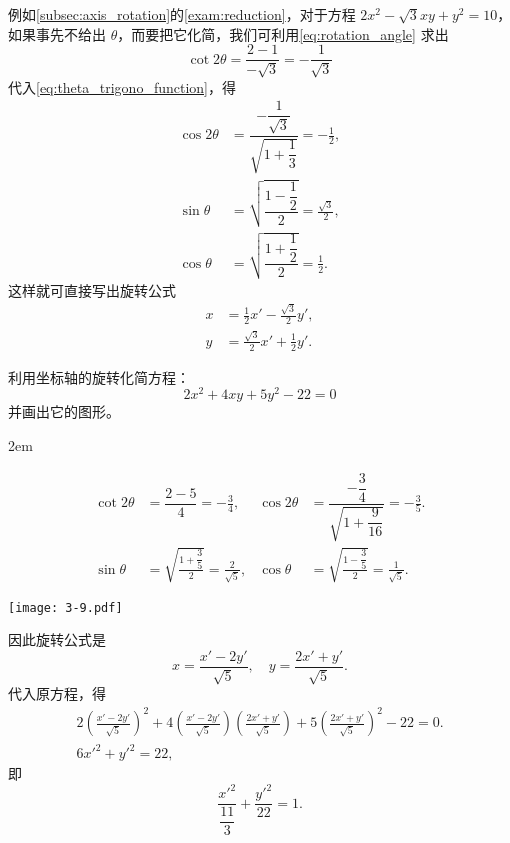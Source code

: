 例如\cref{subsec:axis_rotation}的\cref{exam:reduction}，对于方程 $2x^2-\sqrt{3}xy+y^2=10$，如果事先不给出 $\theta$，而要把它化简，我们可利用\cref{eq:rotation_angle} 求出
\[\cot2\theta=\frac{2-1}{-\sqrt{3}}=-\frac{1}{\sqrt{3}}\]
代入\cref{eq:theta_trigono_function}，得
\begin{align*}
  \cos2\theta&=\dfrac{-\dfrac{1}{\sqrt{3}}}{\sqrt{1+\dfrac{1}{3}}}=-\frac{1}{2},\\[8pt]
  \sin\theta&=\sqrt{\dfrac{1-\dfrac{1}{2}}{2}}=\frac{\sqrt{3}}{2},\\[8pt]
  \cos\theta&=\sqrt{\dfrac{1+\dfrac{1}{2}}{2}}=\frac{1}{2}.
\end{align*}
这样就可直接写出旋转公式
\begin{align*}
  x&=\frac{1}{2}x'-\frac{\sqrt{3}}{2}y',\\
  y&=\frac{\sqrt{3}}{2}x'+\frac{1}{2}y'.
\end{align*}

\begin{example}
  利用坐标轴的旋转化简方程：
  \[2x^2+4xy+5y^2-22=0\]
  并画出它的图形。
\end{example}
\noindent
\begin{minipage}{0.65\linewidth}\parindent2em
\begin{solution}
  \begin{align*}
    \cot2\theta&=\dfrac{2-5}{4}=-\frac{3}{4},&
    \cos2\theta&=\dfrac{-\dfrac{3}{4}}{\sqrt{1+\dfrac{9}{16}}}=-\frac{3}{5}.\\
    \sin \theta&=\sqrt{\frac{1+\dfrac{3}{5}}{2}}=\frac{2}{\sqrt{5}},&
    \cos \theta&=\sqrt{\frac{1-\dfrac{3}{5}}{2}}=\frac{1}{\sqrt{5}}.
  \end{align*}
\end{solution}
\end{minipage}\hfill
\begin{minipage}{0.3\linewidth}\centering
\begin{figurehere}
  \texttt{[image: 3-9.pdf]}
  \caption{}\label{fig:3-9}
\end{figurehere}
\end{minipage}

\bigskip\noindent
因此旋转公式是
  \[ x=\frac{x'-2y'}{\sqrt{5}},\quad y=\frac{2x'+y'}{\sqrt{5}}.\]
  代入原方程，得
  \begin{gather*}
    2\left(\frac{x'-2y'}{\sqrt{5}}\right)^2+4\left(\frac{x'-2y'}{\sqrt{5}}\right)\left(\frac{2x'+y'}{\sqrt{5}}\right)+5\left(\frac{2x'+y'}{\sqrt{5}}\right)^2-22=0.\\
    6x'^2+y'^2=22,
  \end{gather*}
即
  \[\frac{x'^2}{\dfrac{11}{3}}+\frac{y'^2}{22}=1.\]

